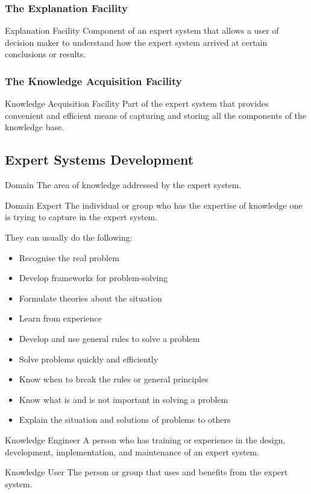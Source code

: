 \documentclass[\main/notes.tex]{subfiles}
\begin{document}
				\subsubsection{The Explanation Facility}
					\begin{definition}{Explanation Facility}
						Component of an expert system that allows a user of decision maker to understand how the expert system arrived at certain conclusions or results.
					\end{definition}
				\subsubsection{The Knowledge Acquisition Facility}
					\begin{definition}{Knowledge Acquisition Facility}
						Part of the expert system that provides convenient and efficient means of capturing and storing all the components of the knowledge base.
					\end{definition}
			\subsection{Expert Systems Development}
				\begin{definition}{Domain}
					The area of knowledge addressed by the expert system.
				\end{definition}
				\begin{definition}{Domain Expert}
					The individual or group who has the expertise of knowledge one is trying to capture in the expert system.

					They can usually do the following:
					\begin{multicols}{2}
						\begin{itemize}[nosep]
							\item Recognise the real problem
							\item Develop frameworks for problem-solving
							\item Formulate theories about the situation
							\item Learn from experience
							\item Develop and use general rules to solve a problem
							\item Solve problems quickly and efficiently
							\item Know when to break the rules or general principles
							\item Know what is and is not important in solving a problem
							\item Explain the situation and solutions of problems to others
						\end{itemize}
					\end{multicols}
				\end{definition}
				\begin{definition}{Knowledge Engineer}
					A person who has training or experience in the design, development, implementation, and maintenance of an expert system.
				\end{definition}
				\begin{definition}{Knowledge User}
					The person or group that uses and benefits from the expert system.
				\end{definition}
\end{document}
